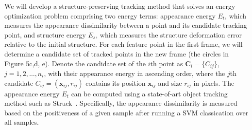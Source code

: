 
We will develop a structure-preserving tracking method that solves an energy optimization problem comprising
two energy terms:
appearance energy $ E_t $, which measures the appearance dissimilarity between a point and its candidate tracking point,
and structure energy $ E_s $, which measures the structure deformation error relative to {the} initial structure.
For each feature point in the first frame, we will determine a candidate set of tracked points {in the new frame} (the circles in Figure 5c,d, e). 
Denote the candidate set of the $i$th point as $ \mathbf{C}_i  = \{C_{ij}\}$, $j = 1, 2, \ldots, n_i $,  with their appearance energy in ascending order, where the $ j $th candidate $ C_{ij} = (\mathbf{x}_{ij}, r_{ij}) $ contains its position $ \mathbf{x}_{ij} $ and size $ r_{ij} $ in pixels.
The appearance energy $ E_t $ 
can be computed using a state-of-art object tracking method such as Struck~\cite{6126251}. 
Specifically, the appearance dissimilarity is measured based on the positiveness of a given sample after running a SVM classication over all samples.

